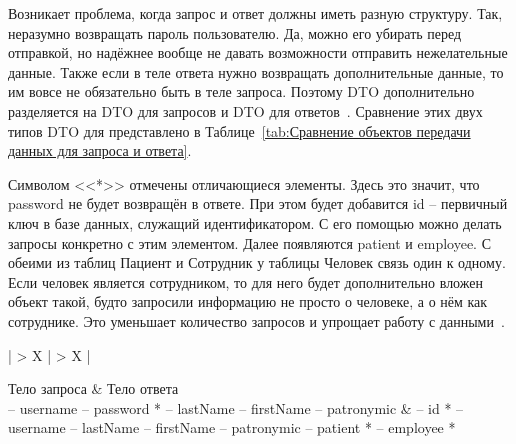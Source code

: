 \documentclass[a4paper,article]{article}
\begin{document}
\begin{sloppypar}
    Возникает проблема, когда запрос и ответ должны иметь разную структуру. Так, неразумно возвращать пароль пользователю. Да, можно его убирать перед отправкой, но надёжнее вообще не давать возможности отправить нежелательные данные. Также если в теле ответа нужно возвращать дополнительные данные, то им вовсе не обязательно быть в теле запроса. Поэтому DTO дополнительно разделяется на DTO для запросов и DTO для ответов~\cite{baeldungbook}. Сравнение этих двух типов DTO для  представлено в Таблице~\ref{tab:Сравнение объектов передачи данных для запроса и ответа}.
    
    Символом <<*>> отмечены отличающиеся элементы. Здесь это значит, что password не будет возвращён в ответе. При этом будет добавится id -- первичный ключ в базе данных, служащий идентификатором. С его помощью можно делать запросы конкретно с этим элементом. Далее появляются patient и employee. С обеими из таблиц Пациент и Сотрудник у таблицы Человек связь один к одному. Если человек является сотрудником, то для него будет дополнительно вложен объект такой, будто запросили информацию не просто о человеке, а о нём как сотруднике. Это уменьшает количество запросов и упрощает работу с данными~\cite{baeldungbook, webapi}.

    \begin{xltabular}{\textwidth} { |
        >{\hsize} X |
        >{\hsize} X | }

        \hline
        Тело запроса
        & Тело ответа \\

        \hline
        -- username \newline -- password * \newline -- lastName \newline -- firstName \newline -- patronymic
        & -- id * \newline -- username \newline -- lastName \newline -- firstName \newline -- patronymic \newline -- patient * \newline -- employee * \\

        \hline

        \caption{\centering Сравнение объектов передачи данных для запроса и ответа}

        \label{tab:Сравнение объектов передачи данных для запроса и ответа}
    \end{xltabular}


\end{sloppypar}
\end{document}
